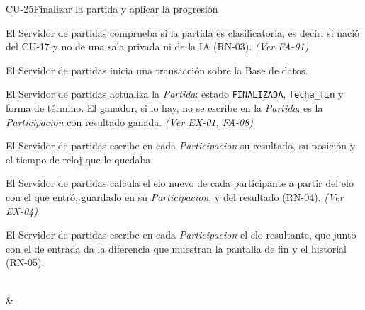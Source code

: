 \begin{fichacu}{CU-25}{Finalizar la partida y aplicar la progresión}
{\begin{cuenum}[start=1]
      \item El Servidor de partidas comprueba si la partida es clasificatoria, es decir, si nació del \mbox{CU-17} y no de una sala privada ni de la IA (\mbox{RN-03}). \textit{(Ver \mbox{FA-01})}
      \item El Servidor de partidas inicia una transacción sobre la Base de datos.
      \item El Servidor de partidas actualiza la \textit{Partida}: estado \texttt{FINALIZADA}, \texttt{fecha\_\allowbreak{}fin} y forma de término. El ganador, si lo hay, no se escribe en la \textit{Partida}: es la \textit{Participacion} con resultado ganada. \textit{(Ver \mbox{EX-01}, \mbox{FA-08})}
      \item El Servidor de partidas escribe en cada \textit{Participacion} su resultado, su posición y el tiempo de reloj que le quedaba.
      \item El Servidor de partidas calcula el elo nuevo de cada participante a partir del elo con el que entró, guardado en su \textit{Participacion}, y del resultado (\mbox{RN-04}). \textit{(Ver \mbox{EX-04})}
      \item El Servidor de partidas escribe en cada \textit{Participacion} el elo resultante, que junto con el de entrada da la diferencia que muestran la pantalla de fin y el historial (\mbox{RN-05}).
    \end{cuenum}} \\
   & 
\end{fichacu}
